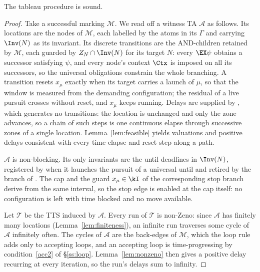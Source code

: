 \begin{theorem}%
    \label{thm:soundness}
The tableau procedure is sound.
\end{theorem}
\begin{proof}
Take a successful marking $\mathcal{M}$. We read off a witness TA $\mathcal{A}$ as follows.
Its locations are the nodes of $\mathcal{M}$, each labelled by the atoms in its $\Gamma$ and
carrying $\Inv(N)$ as its invariant.
Its discrete transitions are the AND-children retained by $\mathcal{M}$, each guarded by
$Z_N\cap\Inv(N)$ for its target $N$: every $\EX\psi$ obtains a successor satisfying $\psi$, and
every node's context $\Ctx$ is imposed on all its successors, so the universal obligations
constrain the whole branching. A transition resets $x_\mu$ exactly when its target carries a
launch of $\mu$, so that the window is measured from the demanding configuration; the residual
of a live pursuit crosses without reset, and $x_\mu$ keeps running. Delays are supplied by
, which generates no transitions: the location is unchanged and only the zone
advances, so a chain of such steps is one continuous elapse through successive zones of a single
location. Lemma~\ref{lem:feasible} yields valuations and positive delays consistent with every
time-elapse and reset step along a path.

 $\mathcal{A}$ is non-blocking. Its only invariants are the until deadlines in $\Inv(N)$,
registered by  when it launches the pursuit of a universal until and retired by
the  branch of . The cap and the guard $x_\mu\in\kI$ of the corresponding stop branch derive from the same
interval, so the stop edge is enabled at the cap itself: no configuration is left with time
blocked and no move available.

Let $\mathcal{T}$ be the TTS induced by $\mathcal{A}$. Every run of $\mathcal{T}$ is non-Zeno:
since $\mathcal{A}$ has finitely many locations (Lemma~\ref{lem:finiteness}), an infinite run
traverses some cycle of $\mathcal{A}$ infinitely often. The cycles of $\mathcal{A}$ are the
back-edges of $\mathcal{M}$, which the loop rule adds only to accepting loops, and an accepting
loop is time-progressing by condition~\ref{acc2} of \S\ref{ss:loop}. Lemma~\ref{lem:nonzeno} then
gives a positive delay recurring at every iteration, so the run's delays sum to infinity.



\end{proof}
